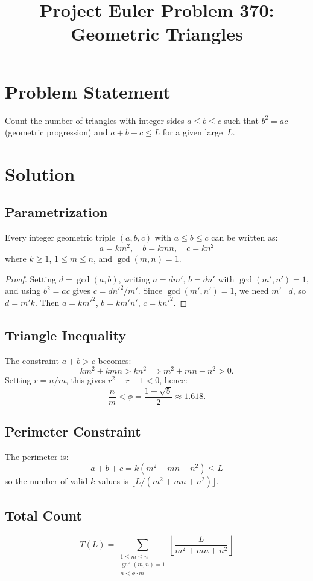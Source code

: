 \documentclass[12pt]{article}
\title{Project Euler Problem 370: Geometric Triangles}
\author{}
\date{}
\begin{document}
\maketitle

\section{Problem Statement}
Count the number of triangles with integer sides $a \leq b \leq c$ such that $b^2 = ac$ (geometric progression) and $a + b + c \leq L$ for a given large~$L$.

\section{Solution}

\subsection{Parametrization}
Every integer geometric triple $(a, b, c)$ with $a \leq b \leq c$ can be written as:
\[
a = k m^2, \quad b = k m n, \quad c = k n^2
\]
where $k \geq 1$, $1 \leq m \leq n$, and $\gcd(m, n) = 1$.

\begin{proof}
Setting $d = \gcd(a,b)$, writing $a = dm'$, $b = dn'$ with $\gcd(m',n')=1$, and using $b^2 = ac$ gives $c = dn'^2/m'$. Since $\gcd(m',n')=1$, we need $m' \mid d$, so $d = m'k$. Then $a = km'^2$, $b = km'n'$, $c = kn'^2$.
\end{proof}

\subsection{Triangle Inequality}
The constraint $a + b > c$ becomes:
\[
km^2 + kmn > kn^2 \implies m^2 + mn - n^2 > 0.
\]
Setting $r = n/m$, this gives $r^2 - r - 1 < 0$, hence:
\[
\frac{n}{m} < \phi = \frac{1 + \sqrt{5}}{2} \approx 1.618.
\]

\subsection{Perimeter Constraint}
The perimeter is:
\[
a + b + c = k(m^2 + mn + n^2) \leq L
\]
so the number of valid $k$ values is $\lfloor L / (m^2 + mn + n^2) \rfloor$.

\subsection{Total Count}
\[
T(L) = \sum_{\substack{1 \leq m \leq n \\ \gcd(m,n) = 1 \\ n < \phi \cdot m}} \left\lfloor \frac{L}{m^2 + mn + n^2} \right\rfloor
\]
\end{document}
